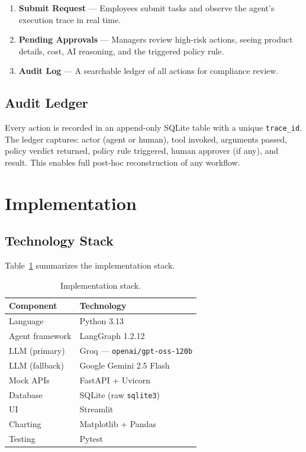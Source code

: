 \documentclass[11pt,a4paper]{article}
\begin{document}
\begin{enumerate}[leftmargin=*, itemsep=2pt]
    \item \textbf{Submit Request} --- Employees submit tasks and observe the agent's execution trace in real time.
    \item \textbf{Pending Approvals} --- Managers review high-risk actions, seeing product details, cost, AI reasoning, and the triggered policy rule.
    \item \textbf{Audit Log} --- A searchable ledger of all actions for compliance review.
\end{enumerate}

\subsection{Audit Ledger}

Every action is recorded in an append-only SQLite table with a unique \texttt{trace\_id}. The ledger captures: actor (agent or human), tool invoked, arguments passed, policy verdict returned, policy rule triggered, human approver (if any), and result. This enables full post-hoc reconstruction of any workflow.

\section{Implementation}
\label{sec:implementation}

\subsection{Technology Stack}

Table~\ref{tab:stack} summarizes the implementation stack.

\begin{table}[H]
\centering
\small
\caption{Implementation stack.}
\label{tab:stack}
\begin{tabular}{@{}ll@{}}
\toprule
\textbf{Component} & \textbf{Technology} \\
\midrule
Language & Python 3.13 \\
Agent framework & LangGraph 1.2.12 \\
LLM (primary) & Groq --- \texttt{openai/gpt-oss-120b} \\
LLM (fallback) & Google Gemini 2.5 Flash \\
Mock APIs & FastAPI + Uvicorn \\
Database & SQLite (raw \texttt{sqlite3}) \\
UI & Streamlit \\
Charting & Matplotlib + Pandas \\
Testing & Pytest \\
\bottomrule
\end{tabular}
\end{table}
\end{document}
